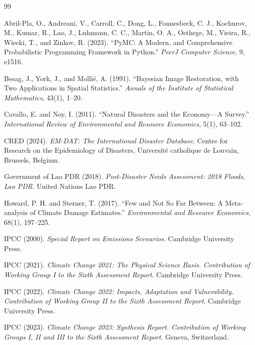 \documentclass[11pt,a4paper]{article}
\begin{document}
\makeatletter
\renewcommand{\@biblabel}[1]{}
\makeatother
\begin{thebibliography}{99}

Abril-Pla, O., Andreani, V., Carroll, C., Dong, L., Fonnesbeck, C. J., Kochurov, M., Kumar, R., Lao, J., Luhmann, C. C., Martin, O. A., Osthege, M., Vieira, R., Wiecki, T., and Zinkov, R. (2023).
``PyMC: A Modern, and Comprehensive Probabilistic Programming Framework in Python.''
\textit{PeerJ Computer Science}, 9, e1516.

Besag, J., York, J., and Molli\'{e}, A. (1991).
``Bayesian Image Restoration, with Two Applications in Spatial Statistics.''
\textit{Annals of the Institute of Statistical Mathematics}, 43(1), 1--20.

Cavallo, E. and Noy, I. (2011).
``Natural Disasters and the Economy---A Survey.''
\textit{International Review of Environmental and Resource Economics}, 5(1), 63--102.

CRED (2024).
\textit{EM-DAT: The International Disaster Database}.
Centre for Research on the Epidemiology of Disasters, Universit\'{e} catholique de Louvain, Brussels, Belgium.

Government of Lao PDR (2018).
\textit{Post-Disaster Needs Assessment: 2018 Floods, Lao PDR}.
United Nations Lao PDR.

Howard, P. H. and Sterner, T. (2017).
``Few and Not So Far Between: A Meta-analysis of Climate Damage Estimates.''
\textit{Environmental and Resource Economics}, 68(1), 197--225.

IPCC (2000).
\textit{Special Report on Emissions Scenarios}.
Cambridge University Press.

IPCC (2021).
\textit{Climate Change 2021: The Physical Science Basis. Contribution of Working Group I to the Sixth Assessment Report}.
Cambridge University Press.

IPCC (2022).
\textit{Climate Change 2022: Impacts, Adaptation and Vulnerability. Contribution of Working Group II to the Sixth Assessment Report}.
Cambridge University Press.

IPCC (2023).
\textit{Climate Change 2023: Synthesis Report. Contribution of Working Groups I, II and III to the Sixth Assessment Report}.
Geneva, Switzerland.


\end{thebibliography}
\end{document}
